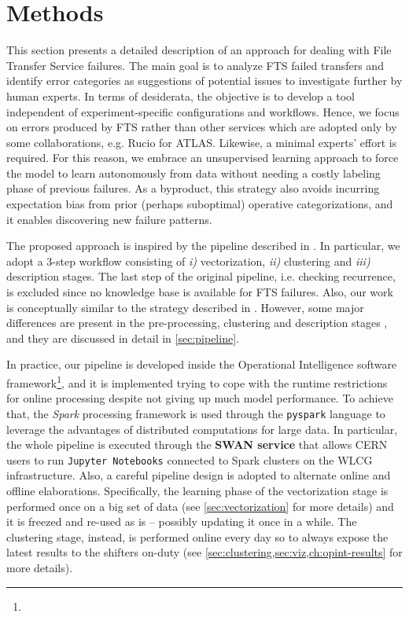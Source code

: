 \chapter{Methods}

This section presents a detailed description of an approach for dealing with File Transfer Service failures. %
The main goal is to analyze FTS failed transfers and identify error categories as suggestions of potential issues to investigate further by human experts.
In terms of desiderata, the objective is to develop a tool independent of experiment-specific configurations and workflows. Hence, we focus on errors produced by FTS rather than other services which are adopted only by some collaborations, e.g. Rucio for ATLAS.
Likewise, a minimal experts' effort is required. For this reason, we embrace an unsupervised learning approach to force the model to learn autonomously from data without needing a costly labeling phase of previous failures.
As a byproduct, this strategy also avoids incurring expectation bias from prior (perhaps suboptimal) operative categorizations, and it enables discovering new failure patterns.

The proposed approach \cite[Section 2.19]{opint2022} is inspired by the pipeline described in . %
In particular, we adopt a 3-step workflow consisting of \textit{i)} vectorization, \textit{ii)} clustering and \textit{iii)} description stages. 
The last step of the original pipeline, i.e. checking recurrence, is excluded since no knowledge base is available for FTS failures.
Also, our work is conceptually similar to the strategy described in . However, some major differences are present in the pre-processing, clustering and description stages%
, and they are discussed in detail in \cref{sec:pipeline}.

In practice, our pipeline is developed inside the Operational Intelligence software framework\footnote{\githubpyspark}, and it is implemented trying to cope with the runtime restrictions for online processing despite not giving up much model performance.
To achieve that, the \textit{Spark} \cite{zaharia2010spark} processing framework is used through the \texttt{pyspark} language to leverage the advantages of distributed computations for large data. 
In particular, the whole pipeline is executed through the \textbf{SWAN service} \cite{piparo2018swan} that allows CERN users to run \texttt{Jupyter Notebooks} connected to Spark clusters on the WLCG infrastructure.
Also, a careful pipeline design is adopted to alternate online and offline elaborations.
Specifically, the learning phase of the vectorization stage is performed once on a big set of data (see \cref{sec:vectorization} for more details) and it is freezed and re-used as is -- possibly updating it once in a while.
The clustering stage, instead, is performed online every day so to always expose the latest results to the shifters on-duty (see %
\cref{sec:clustering,sec:viz,ch:opint-results}
for more details).
